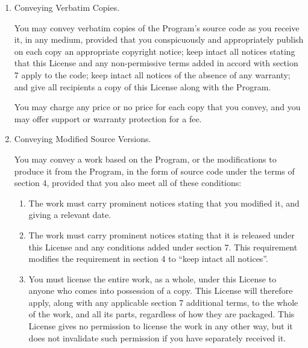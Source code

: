 \documentclass[10pt,a4paper,ngerman,titlepage,tocindentauto]{article}
\begin{document}
\begin{multicols}{3}
{\begin{enumerate}
					\item Conveying Verbatim Copies.

					You may convey verbatim copies of the Program's source code as you
					receive it, in any medium, provided that you conspicuously and
					appropriately publish on each copy an appropriate copyright notice;
					keep intact all notices stating that this License and any
					non-permissive terms added in accord with section 7 apply to the code;
					keep intact all notices of the absence of any warranty; and give all
					recipients a copy of this License along with the Program.

					You may charge any price or no price for each copy that you convey,
					and you may offer support or warranty protection for a fee.

					\item Conveying Modified Source Versions.

					You may convey a work based on the Program, or the modifications to
					produce it from the Program, in the form of source code under the
					terms of section 4, provided that you also meet all of these conditions:
					  \begin{enumerate}
					  \item The work must carry prominent notices stating that you modified
					  it, and giving a relevant date.

					  \item The work must carry prominent notices stating that it is
					  released under this License and any conditions added under section
					  7.  This requirement modifies the requirement in section 4 to
					  ``keep intact all notices''.

					  \item You must license the entire work, as a whole, under this
					  License to anyone who comes into possession of a copy.  This
					  License will therefore apply, along with any applicable section 7
					  additional terms, to the whole of the work, and all its parts,
					  regardless of how they are packaged.  This License gives no
					  permission to license the work in any other way, but it does not
					  invalidate such permission if you have separately received it.


\end{enumerate}
\end{enumerate}}
\end{multicols}
\end{document}
